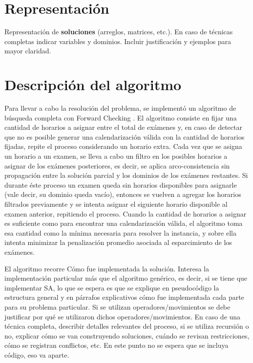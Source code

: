 \documentclass[letter, 10pt]{article}
\begin{document}
\section{Representaci\'on}
Representaci\'on de \textbf{soluciones} (arreglos, matrices, etc.). En caso de t\'ecnicas completas indicar variables y dominios. Incluir justificaci\'on y ejemplos para mayor claridad.

\section{Descripci\'on del algoritmo}

Para llevar a cabo la resolución del problema, se implementó un algoritmo de búsqueda completa con Forward Checking \cite{forwardchecking}. El algoritmo consiste en fijar una cantidad de horarios a asignar entre el total de exámenes y, en caso de detectar que no es posible generar una calendarización válida con la cantidad de horarios fijadas, repite el proceso considerando un horario extra. Cada vez que se asigna un horario a un examen, se lleva a cabo un filtro en los posibles horarios a asignar de los exámenes posteriores, es decir, se aplica arco-consistencia sin propagación entre la solución parcial y los dominios de los exámenes restantes. Si durante éste proceso un examen queda sin horarios disponibles para asignarle (vale decir, su dominio queda vacío), entonces se vuelven a agregar los horarios filtrados previamente y se intenta asignar el siguiente horario disponible al examen anterior, repitiendo el proceso. Cuando la cantidad de horarios a asignar es suficiente como para encontrar una calendarización válida, el algoritmo toma esa cantidad como la mínima necesaria para resolver la instancia, y sobre ella intenta minimizar la penalización promedio asociada al esparcimiento de los exámenes. 



El algoritmo recorre 
C\'omo fue implementada la soluci\'on. Interesa la implementaci\'on particular m\'as que el algoritmo gen\'erico, es decir, si se tiene que implementar SA, lo que se espera es que se explique en pseudoc\'odigo la estructura
general y en p\'arrafos explicativos c\'omo fue implementada cada parte para su problema particular. Si
se utilizan operadores/movimientos se debe justificar por qu\'e se utilizaron dichos operadores/movimientos. 
En caso de una t\'ecnica completa, describir detalles relevantes del proceso, si se utiliza recursi\'on o no, explicar c\'omo se van construyendo soluciones, cu\'ando se revisan restricciones, c\'omo se registran conflictos, etc. En este punto no se espera que se incluya c\'odigo, eso va aparte.
\end{document}
